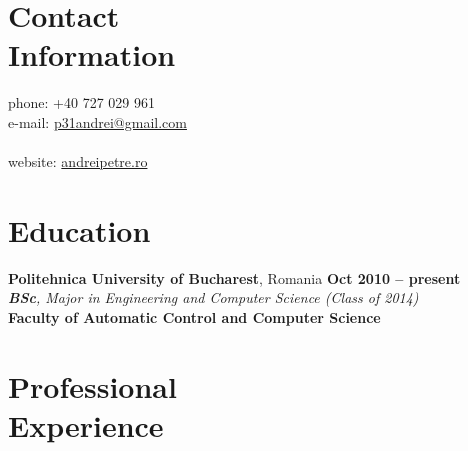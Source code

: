 \documentclass[margin,line]{resume}
\begin{document}
\begin{resume}

    \section{\mysidestyle Contact\\Information}

	phone: +40 727 029 961              \\
	e-mail:  \href{mailto:p31andrei@gmail.com}{p31andrei@gmail.com}  \vspace{0mm}\\\vspace{-4.5mm}\\%
	website: \href{http://andreipetre.ro}{andreipetre.ro}

    \section{\mysidestyle Education}

	\textbf{Politehnica University of Bucharest}, Romania \hfill \textbf{ Oct 2010 -- present}\vspace{1.2mm}\\%
	\textsl{\textbf{BSc}, Major in Engineering and Computer Science (Class of 2014)}\vspace{1.5mm}\\
	\small{\textbf{Faculty of Automatic Control and Computer Science}}

    \section{\mysidestyle Professional\\Experience}


\end{resume}
\end{document}
